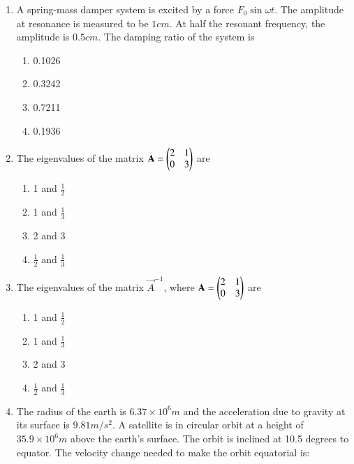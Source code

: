 \documentclass[journal]{IEEEtran}
\begin{document}
\begin{enumerate}
    \item A spring-mass damper system is excited by a force $F_0\sin\omega t$. The amplitude at resonance
    is measured to be $1 cm$. At half the resonant frequency, the amplitude is $0.5 cm$. The damping ratio
    of the system is

    \begin{multicols}{4}
        \begin{enumerate}
            \item 0.1026
            \item 0.3242
            \item 0.7211
            \item 0.1936
        \end{enumerate}
    \end{multicols}

    \item The eigenvalues of the matrix $\mathbf{A} = \begin{pmatrix}2 & 1 \\ 0 & 3\end{pmatrix}$ are

    \begin{multicols}{4}
        \begin{enumerate}
            \item 1 and $\frac{1}{2}$
            \item 1 and $\frac{1}{3}$
            \item 2 and 3
            \item $\frac{1}{2}$ and $\frac{1}{3}$
        \end{enumerate}
    \end{multicols}

    \item The eigenvalues of the matrix $\vec{A}^{-1}$, where $\mathbf{A} = \begin{pmatrix}2 & 1 \\ 0 & 3\end{pmatrix}$ are

    \begin{multicols}{4}
        \begin{enumerate}
            \item 1 and $\frac{1}{2}$
            \item 1 and $\frac{1}{3}$
            \item 2 and 3
            \item $\frac{1}{2}$ and $\frac{1}{3}$
        \end{enumerate}
    \end{multicols}

    \item The radius of the earth is $6.37 \times 10^6 m$ and the acceleration due to gravity
    at its surface is $9.81 m/s^2$. A satellite is in circular orbit at a height of
    $35.9 \times 10^6 m$ above the earth's surface. The orbit is inclined at 10.5 degrees to
    equator. The velocity change needed to make the orbit equatorial is:


\end{enumerate}
\end{document}
